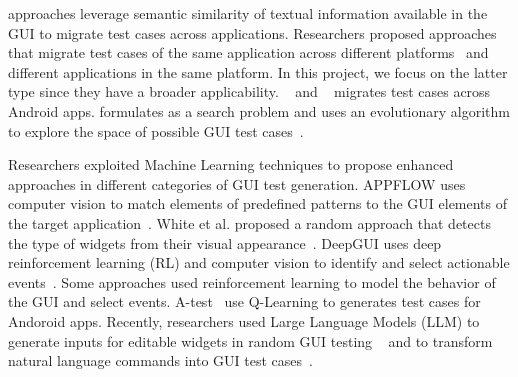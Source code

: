 \smallskip 
\testreuse approaches leverage semantic similarity of textual information available in the GUI to migrate test cases across applications.
Researchers proposed approaches that migrate test cases of the same application across different platforms~\cite{talebipour:MAPIT:ASE:2021} and different applications in the same platform\cite{rau:efficent:icse:2018}. 
In this project, we focus on the latter type since they have a broader applicability.
 \craftdroid~\cite{lin:craftdroid:ASE:2019} and \atm~\cite{Behrang:migration:ICSE:2018} migrates test cases across Android apps.
 \adaptdroid formulates \testreuse as a search problem and uses an evolutionary algorithm to explore the space of possible GUI test cases~\cite{Mariani:Adaptdroid:AST:2021}.
 
 
\smallskip 
Researchers exploited Machine Learning techniques to propose enhanced approaches in different categories of GUI test generation.
APPFLOW uses computer vision to match elements of predefined patterns to the GUI elements of the target application~\cite{Hu:appflow:FSE:2018}.
White et al. proposed a random approach that detects the type of widgets from their visual appearance~\cite{white:WidgetDetection:ISSTA:2019}.
DeepGUI uses deep reinforcement learning (RL) and computer vision to identify and select actionable events~\cite{YazdaniBanafsheDaragh:DEEPGUI:ASE:2021}.
Some approaches used reinforcement learning to model the behavior of the GUI and select events.
A-test~\cite{Vuong:RLTest:A-Test:2018} use Q-Learning to generates test cases  for Andoroid apps.
Recently, researchers used Large Language Models (LLM) to generate inputs for editable widgets in random GUI testing ~\cite{liu:GUIInputLLM:ICSE:2023} and to transform natural language commands into GUI test cases~\cite{Zimmermann:GPT3GUITest:2023:ICSTW}. 

